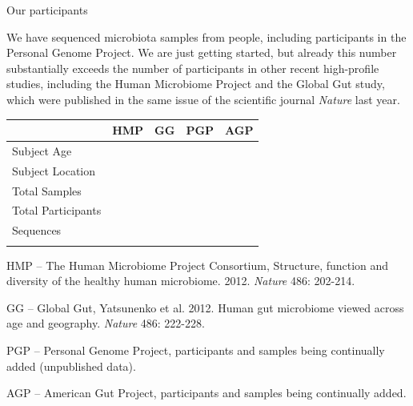 \documentclass[10pt,letterpaper]{article}
\newenvironment{my_itemize}{
\begin{itemize}
  \setlength{\itemsep}{1pt}
  \setlength{\parskip}{0pt}
  \setlength{\parsep}{0pt}}{\end{itemize}
}
\begin{document}
\colorbox{agpMustard}{\parbox{\textwidth}{\vspace{1mm} \LARGE \centering Our participants \vspace{1mm}}}

We have sequenced \numSamples{} microbiota samples from \numParticipants{} people, including \pgpParticipants{} participants in the Personal Genome Project. We are just getting started, but already this number substantially exceeds the number of participants in other recent high-profile studies, including the Human Microbiome Project and the Global Gut study, which were published in the same issue of the scientific journal {\em Nature} last year.

\begin{framed}
\parbox{0.30\textwidth}{
}
\hspace{5mm}
\parbox{0.60\textwidth}{
{\footnotesize
\begin{tabular}{ l c c c c }													
\hline \addlinespace[1mm]													
 & HMP & GG	& PGP & AGP \\		
\hline \addlinespace[1mm]													
Subject Age & \hmpAge{} & \ggAge{} & \pgpAge{} & \agpAge{} \\
Subject Location & \hmpLocation{} & \ggLocation{} & \pgpLocation{} & \agpLocation{} \\
Total Samples & \hmpSamples{} & \ggSamples{} & \pgpSamples{} & \agpSamples{} \\
Total Participants & \hmpParticipants{} & \ggParticipants{} & \pgpParticipants{} & \agpParticipants{} \\
Sequences & \hmpSequences{} & \ggSequences{} & \pgpSequences{} & \agpSequences{} \\ \addlinespace[.5mm]
\hline															
\end{tabular}															
}
}
\vspace{-8mm}
{\fontsize{7pt}{7pt}\selectfont
\begin{my_itemize}
\item[] HMP -- The Human Microbiome Project Consortium, Structure, function and diversity of the healthy human microbiome. 2012. {\em Nature} 486: 202-214.
\item[] GG -- Global Gut, Yatsunenko et al. 2012. Human gut microbiome viewed across age and geography. {\em Nature} 486: 222-228.
\item[] PGP -- Personal Genome Project, participants and samples being continually added (unpublished data).
\item[] AGP -- American Gut Project, participants and samples being continually added.
\end{my_itemize}
\vspace{-3mm}
}
\label{tab1} 
\end{framed}
\end{document}
